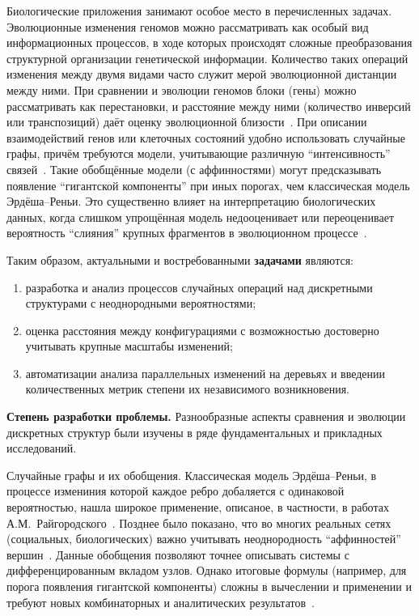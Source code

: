 Биологические приложения занимают особое место в перечисленных задачах.  
Эволюционные изменения геномов можно рассматривать как особый вид информационных процессов, в ходе которых происходят сложные преобразования структурной организации генетической информации. 
Количество таких операций изменения между двумя видами часто служит мерой эволюционной дистанции между ними. 
При сравнении и эволюции геномов блоки (гены) можно рассматривать как перестановки, и расстояние между ними (количество инверсий или транспозиций) даёт оценку эволюционной близости~\cite{yancopoulos2005,braga2010}.  
При описании взаимодействий генов или клеточных состояний удобно использовать случайные графы, причём требуются модели, учитывающие различную ``интенсивность'' связей~\cite{Barabsi2004}. 
Такие обобщённые модели (с аффинностями) могут предсказывать появление ``гигантской компоненты'' при иных порогах, чем классическая модель Эрдёша--Реньи. 
Это существенно влияет на интерпретацию биологических данных, когда слишком упрощённая модель недооценивает или переоценивает вероятность ``слияния'' крупных фрагментов в эволюционном процессе~\cite{tannier2016}.  

Таким образом, актуальными и востребованными \textbf{задачами} являются:  
\begin{enumerate}
    \item разработка и анализ процессов случайных операций над дискретными структурами с неоднородными вероятностями;  
    \item оценка расстояния между конфигурациями с возможностью достоверно учитывать крупные масштабы изменений;  
    \item автоматизации анализа параллельных изменений на деревьях и введении количественных метрик степени их независимого возникновения. 
\end{enumerate}

\textbf{Степень разработки проблемы.}  
Разнообразные аспекты сравнения и эволюции дискретных структур были изучены в ряде фундаментальных и прикладных исследований.  

Случайные графы и их обобщения. 
Классическая модель Эрдёша--Реньи, в процессе измениния которой каждое ребро добаляется с одинаковой вероятностью, нашла широкое применение, описаное, в частности, в работах А.М.~Райгородского~\cite{райгородский2010модели,райгородский2022модели}.  
Позднее было показано, что во многих реальных сетях (социальных, биологических) важно учитывать неоднородность ``аффинностей'' вершин~\cite{tannier2016}.
Данные обобщения позволяют точнее описывать системы с дифференцированным вкладом узлов.
Однако итоговые формулы (например, для порога появления гигантской компоненты) сложны в вычеслении и применении и требуют новых комбинаторных и аналитических результатов~\cite{tannier2016}.  

